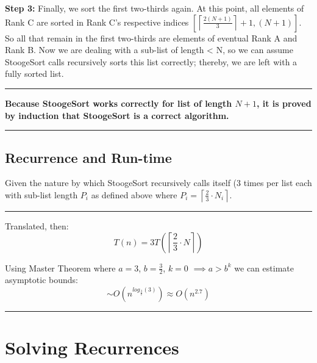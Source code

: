 \documentclass[conference]{styles/acmsiggraph}
\newcommand{\?}{\stackrel{?}{=}}
\begin{document}
\textbf{Step 3:} Finally, we sort the first two-thirds again.  At this point, all elements of Rank C are sorted in Rank C's respective indices $\left [ \left \lceil \frac{2(N+1)}{3} \right \rceil +1, (N+1) \right]$.  So all that remain in the first two-thirds are elements of eventual Rank A and Rank B.  Now we are dealing with a sub-list of length < N, so we can assume StoogeSort calls recursively sorts this list correctly; thereby, we are left with a fully sorted list.\\

\rule{\textwidth}{0.4pt}

\textbf{Because StoogeSort works correctly for list of length $N+1$, it is proved by induction that StoogeSort is a correct algorithm.}

\rule{\textwidth}{0.4pt}


\subsection{Recurrence and Run-time}
Given the nature by which StoogeSort recursively calls itself (3 times per list each with sub-list length $P_i$ as defined above where $P_i = \left\lceil\frac{2}{3}\cdot N_i\right\rceil$. \\ 

\rule{\textwidth}{0.4pt}

Translated, then:
$$T(n) = 3T\left(\left\lceil\frac{2}{3}\cdot N\right\rceil \right)$$

Using Master Theorem where $a = 3$, $b = \frac{3}{2}$, $k = 0$ $\implies a > b^k$ we can estimate asymptotic bounds: \\
$$\sim O(n^{log_{\frac{3}{2}}(3)}) \approx O(n^{2.7})$$

\rule{\textwidth}{0.4pt}












\newpage

\section{Solving Recurrences}

\end{document}
